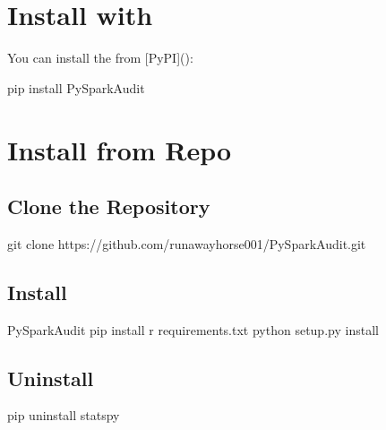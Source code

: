 \documentclass[letterpaper,12pt,english]{sphinxmanual}
\begin{document}
\section{Install with }
\label{\detokenize{install:install-with-pip}}
You can install the  from {[}PyPI{]}():

%
\begin{sphinxVerbatim}[commandchars=\\\{\}]
pip install PySparkAudit
\end{sphinxVerbatim}


\section{Install from Repo}
\label{\detokenize{install:install-from-repo}}

\subsection{Clone the Repository}
\label{\detokenize{install:clone-the-repository}}
%
\begin{sphinxVerbatim}[commandchars=\\\{\}]
git clone https://github.com/runawayhorse001/PySparkAudit.git
\end{sphinxVerbatim}


\subsection{Install}
\label{\detokenize{install:id1}}
%
\begin{sphinxVerbatim}[commandchars=\\\{\}]
 PySparkAudit
pip install \PYGZhy{}r requirements.txt
python setup.py install
\end{sphinxVerbatim}


\subsection{Uninstall}
\label{\detokenize{install:uninstall}}
%
\begin{sphinxVerbatim}[commandchars=\\\{\}]
pip uninstall statspy
\end{sphinxVerbatim}
\end{document}
